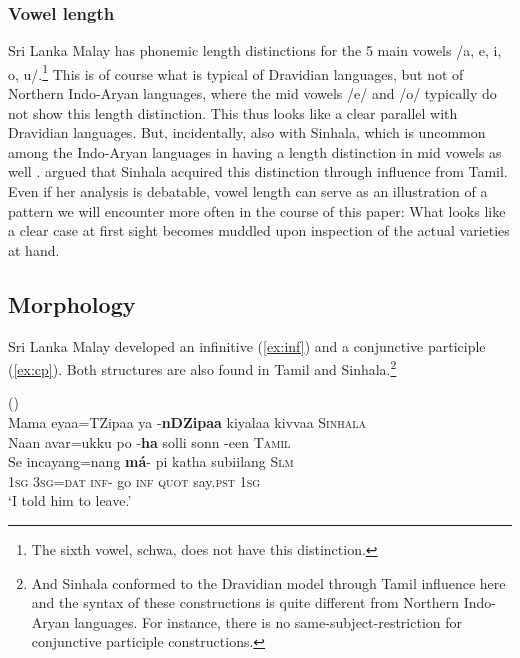 \documentclass{article}
\renewcommand{\tz}{TZipa}
\renewcommand{\dz}{DZipa}
\renewcommand{\xref}[1]{(\ref{#1})}
\renewcommand{\ea}{()\\}
\renewcommand{\trs}[2]{{\em #1\em} `#2'}
\begin{document}
\subsubsection{Vowel length}
Sri Lanka Malay has phonemic length distinctions for the 5 main vowels /a, e, i, o, u/.\footnote{The 
 sixth vowel, schwa, does not have this distinction.
}
This is of course what is typical of Dravidian languages, but not of Northern Indo-Aryan languages, where the mid vowels /e/ and /o/ typically do not show this length distinction. This thus looks like a clear parallel with Dravidian languages. But, incidentally, also with Sinhala, which is uncommon among the Indo-Aryan languages in having a length distinction in mid vowels as well \citep[e.g. \trs{eka}{one} vs. \trs{eeka}{this one} and \trs{mola}{brains} vs. \trs{moola}{mill}, ][xviii]{Karunatillake2004}. \citet{Elizarenkova1972} argued that Sinhala acquired this distinction through influence from Tamil. Even if her analysis is debatable, vowel length can serve as an illustration of a pattern we will encounter more often in the course of this paper: What looks like a clear case at first sight becomes muddled upon inspection of the actual varieties at hand. 


\subsection{Morphology}
Sri  Lanka Malay developed an infinitive \xref{ex:inf} and a conjunctive participle \xref{ex:cp}. Both structures are also found in Tamil and Sinhala.\footnote{And
 Sinhala conformed to the Dravidian model through Tamil influence here and the syntax of these constructions is quite different from Northern Indo-Aryan languages. For instance, there is no same-subject-restriction for conjunctive participle constructions.
}

\ea \label{ex:inf}
\gllll
Mama  eyaa={\tz}a     {}   ya  -\textbf{n{\dz}a} kiyalaa kivvaa       {}   \textsc{Sinhala} \\
Naan  avar=ukku   {}   po  -\textbf{ha}  solli   sonn        -een   \textsc{Tamil} \\
Se    incayang=nang \textbf{m{\'a}}-  pi   {}  katha   subiilang    {}   \textsc{Slm} \\
\textsc{1sg}    \textsc{3sg}=\textsc{dat}      \textsc{inf}- go   \textsc{inf} \textsc{quot}    say.\textsc{pst}    \textsc{1sg} \\
`I told him to leave.'
\z
\end{document}
